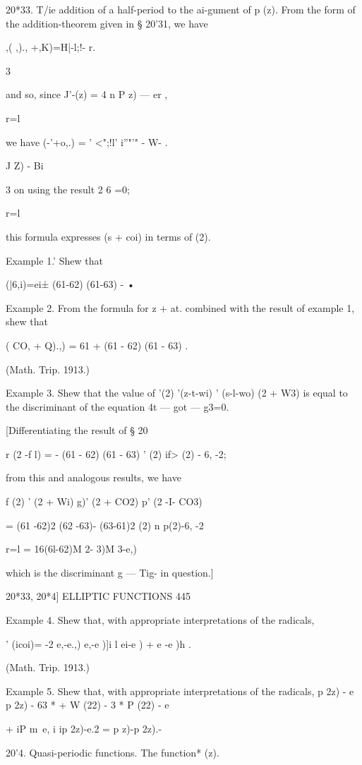 {20*33. T/ie addition of a half-period to the ai-gument of p (z). From
the form of the addition-theorem given in § 20'31, we have

,( ,)., +,K)=H|-l;!- r.

3

and so, since J'-(z) = 4 n P z) — er ,

r=l

we have (-'+o,.) = ' <";!l' i''"'" - W- .

 J Z) - Bi

3 on using the result 2 6 =0;

r=l

this formula expresses (s + coi) in terms of (2).

Example 1.' Shew that

  (|6,i)=ei± (61-62) (61-63) - •

Example 2. From the formula for z + at. combined with the result of
example 1, shew that

  ( CO, + Q).,) = 61 + (61 - 62) (61 - 63) .

(Math. Trip. 1913.)

Example 3. Shew that the value of '(2) '(z-t-wi) ' (s-l-wo) (2 + W3)
is equal to the discriminant of the equation 4t — got — g3=0.

[Differentiating the result of § 20%

r (2 -f l) = - (61 - 62) (61 - 63) ' (2) if> (2) - 6, -2;

from this and analogous results, we have

f (2) ' (2 + Wi) g)' (2 + CO2) p' (2 -I- CO3)

= (61 -62)2 (62 -63)- (63-61)2 (2) n p(2)-6, -2

r=l = 16(6l-62)M 2- 3)M 3-e,)

which is the discriminant g — Tig- in question.]

20*33, 20*4] ELLIPTIC FUNCTIONS 445

Example 4. Shew that, with appropriate interpretations of the
radicals,

 ' (icoi)= -2 e,-e.,) e,-e )]i l ei-e ) + e -e )h .

(Math. Trip. 1913.)

Example 5. Shew that, with appropriate interpretations of the
radicals, p 2z) - e p 2z) - 63 * + W (22) - 3 * P (22) - e

+ iP m~e, i ip 2z)-e.2 = p z)-p 2z).-

20'4. Quasi-periodic functions. The function* (z).

}
